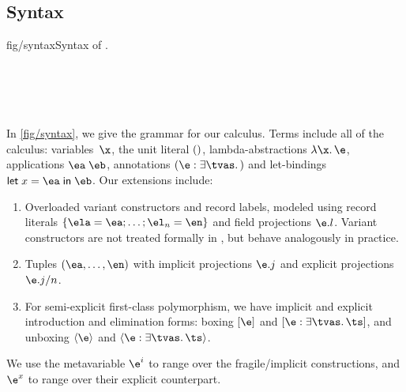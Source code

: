 \documentclass[acmsmall,screen,nonacm,review]{acmart}
\begin{document}
\subsection{Syntax}

\begin{bnffig}[t]{fig/syntax}{Syntax of \OML.}
\\
\\[1ex]
\entry[Types]{\t}{
   \tv \and
   1 \and
   \tya \to \tyb \and
   \T \tys \and
   \Pi \iton \ti \and
   \tpoly \ts
}\\
\\
\\
\end{bnffig}

In \cref {fig/syntax}, we give the grammar for our calculus. Terms include
all of the \ML calculus: variables~$\x$, the unit literal $()$,
lambda-abstractions $\efun \x \e$, applications $\eapp \ea \eb$,
annotations $\eannot \e \tvs \t$ and let-bindings $\elet x \ea \eb$.
Our extensions include:
\begin{enumerate}
\item
  Overloaded variant constructors and record labels, modeled using record
  literals $\erecord { \ela = \ea; \ldots; \el_n = \en }$ and field
  projections $\efield \e l$. Variant constructors are not treated formally in \OML, but
    behave analogously in practice.
\item
  Tuples $(\ea, \ldots, \en)$ with implicit projections
  $\efield \e j$ and explicit projections $\exproj \e j n$.

\item
  For semi-explicit first-class polymorphism, we have implicit and explicit
    introduction and elimination forms: boxing $\epoly \e$ and $\expoly
    \e \tvs \ts$, and unboxing $\einst \e$ and $\exinst \e \tvs \ts$.

\end{enumerate}
We use the metavariable $\e^i$ to range over the
fragile/implicit constructions, and $\e^x$ to range over their
explicit counterpart.
\end{document}
